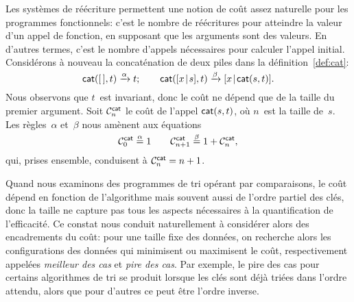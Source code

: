 
Les systèmes de réécriture permettent une notion de coût assez
naturelle pour les programmes fonctionnels: c'est le nombre de
réécritures pour atteindre la valeur d'un appel de fonction, en
supposant que les arguments sont des valeurs. En d'autres termes,
c'est le nombre d'appels nécessaires pour calculer l'appel
initial. Considérons à nouveau la concaténation de deux piles dans la
définition~\eqref{def:cat}:
\begin{equation*}
\fun{cat}(        \el,t) \xrightarrow{\smash{\alpha}} t;\qquad
\fun{cat}(\cons{x}{s},t) \xrightarrow{\smash{\beta}}
\cons{x}{\fun{cat}(s,t)}.
\end{equation*}
Nous observons que \(t\)~est invariant, donc le coût ne dépend que de
la taille du premier argument. Soit
\(\C{\fun{cat}}{n}\) le coût de l'appel
\(\fun{cat}(s,t)\), où \(n\)~est la taille
de~\(s\). Les règles~\(\alpha\) et~\(\beta\) nous amènent aux
équations
\begin{equation*}
  \C{\fun{cat}}{0} \eqn{\smash{\alpha}} 1 \qquad
  \C{\fun{cat}}{n+1} \eqn{\smash{\beta}} 1 + \C{\fun{cat}}{n},
\end{equation*}
qui, prises ensemble, conduisent à \(\C{\fun{cat}}{n} = n + 1\).
\label{cost_cat}



Quand nous examinons des programmes de tri opérant par comparaisons,
le coût dépend en fonction de l'algorithme mais souvent aussi de
l'ordre partiel des clés, donc la taille ne capture pas tous les
aspects nécessaires à la quantification de l'efficacité. Ce constat
nous conduit naturellement à considérer alors des encadrements du
coût: pour une taille fixe des données, on recherche alors les
configurations des données qui minimisent ou maximisent le coût,
respectivement appelées \emph{meilleur des cas} et \emph{pire des
  cas}. Par exemple, le pire des cas pour certains algorithmes de tri
se produit lorsque les clés sont déjà triées dans l'ordre attendu,
alors que pour d'autres ce peut être l'ordre inverse.

\label{par:mean_sort}

